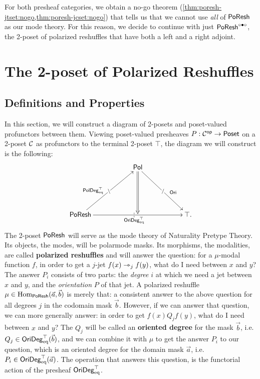 \documentclass[a4paper]{memoir}
\begin{document}
For both presheaf categories, we obtain a no-go theorem (\cref{thm:poresh-jtset:nogo,thm:poresh-jcset:nogo}) that tells us that we cannot use \emph{all} of $\mathsf{PoResh}$ as our mode theory. For this reason, we decide to continue with just $\mathsf{PoResh}^{\circ \bullet \circ}$, the 2-poset of polarized reshuffles that have both a left and a right adjoint.

\section{The 2-poset of Polarized Reshuffles} \label{sec:poresh}

\subsection{Definitions and Properties} \label{sec:poresh:def}
In this section, we will construct a diagram of 2-posets and poset-valued profunctors between them.
Viewing poset-valued presheaves $P : {\mathcal{C}}^{\mathsf{op}} \to {\mathsf{Poset}}$ on a 2-poset ${\mathcal{C}}$ as profunctors to the terminal 2-poset $\top$, the diagram we will construct is the following:
\[
	\xymatrix{
		&& \polcat
			\ar[rrdd]|{/}^(.6){\oripsh}
			\ar@{=>}[dd]
		\\ \\
		\poreshcat
			\ar[rruu]|{\setminus}^(.4){\poldegeqtop}
			\ar[rrrr]|{|}_{\oridegeqtop}
		&&&&
		\top.
	}
\]
The 2-poset $\mathsf{PoResh}$ will serve as the mode theory of Naturality Pretype Theory.
Its objects, the modes, will be polarmode masks.
Its morphisms, the modalities, are called \textbf{polarized reshuffles} and will answer the question: for a $\mu$-modal function $f$, in order to get a $j$-jet $f(x) \rightarrowtriangle_j f(y)$, what do I need between $x$ and $y$?
The answer $P_i$ consists of two parts: the \emph{degree} $i$ at which we need a jet between $x$ and $y$, and the \emph{orientation} $P$ of that jet.
A polarized reshuffle $\mu \in {\mathrm{Hom}}_{\mathsf{PoResh}}(\vec a, \vec b)$ is merely that: a consistent answer to the above question for all degrees $j$ in the codomain mask $\vec b$.
However, if we can answer that question, we can more generally answer: in order to get $f(x) \mathrel{Q_j} f(y)$, what do I need between $x$ and $y$?
The $Q_j$ will be called an \textbf{oriented degree} for the mask $\vec b$, i.e. $Q_j \in \mathsf{OriDeg}_{\mathrm{eq}}^\top(\vec b)$, and we can combine it with $\mu$ to get the answer $P_i$ to our question, which is an oriented degree for the domain mask $\vec a$, i.e.\ $P_i \in \mathsf{OriDeg}_{\mathrm{eq}}^\top(\vec a)$.
The operation that answers this question, is the functorial action of the presheaf $\mathsf{OriDeg}_{\mathrm{eq}}^\top$.
\end{document}
